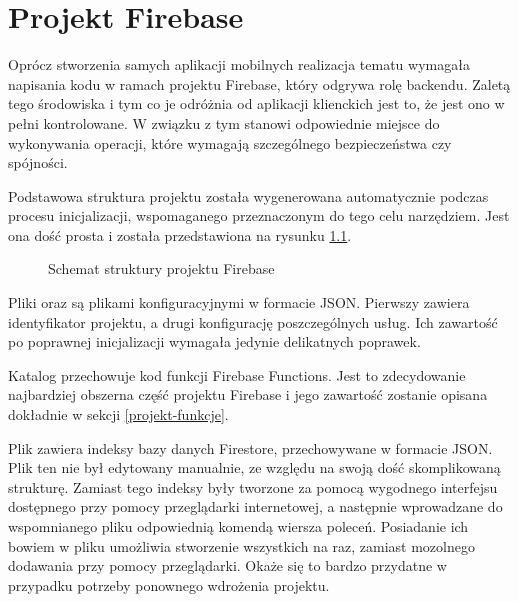 \chapter{Projekt Firebase}
\label{part:firebase}

Oprócz stworzenia samych aplikacji mobilnych realizacja tematu wymagała napisania kodu w ramach projektu Firebase, który odgrywa rolę backendu. Zaletą tego środowiska i tym co je odróżnia od aplikacji klienckich jest to, że jest ono w pełni kontrolowane. W związku z tym stanowi odpowiednie miejsce do wykonywania operacji, które wymagają szczególnego bezpieczeństwa czy spójności.

Podstawowa struktura projektu została wygenerowana automatycznie podczas procesu inicjalizacji, wspomaganego przeznaczonym do tego celu narzędziem. Jest ona dość prosta i została przedstawiona na rysunku \ref{fig:firebase-struktura}.

\begin{figure}[ht!]
  \centering
  \caption{Schemat struktury projektu Firebase}
  \label{fig:firebase-struktura}
\end{figure}

Pliki  oraz  są plikami konfiguracyjnymi w formacie JSON. Pierwszy zawiera identyfikator projektu, a drugi konfigurację poszczególnych usług. Ich zawartość po poprawnej inicjalizacji wymagała jedynie delikatnych poprawek.

Katalog  przechowuje kod funkcji Firebase Functions. Jest to zdecydowanie najbardziej obszerna część projektu Firebase i jego zawartość zostanie opisana dokładnie w sekcji \ref{projekt-funkcje}.

Plik  zawiera indeksy bazy danych Firestore, przechowywane w formacie JSON. Plik ten nie był edytowany manualnie, ze względu na swoją dość skomplikowaną strukturę. Zamiast tego indeksy były tworzone za pomocą wygodnego interfejsu dostępnego przy pomocy przeglądarki internetowej, a następnie wprowadzane do wspomnianego pliku odpowiednią komendą wiersza poleceń. Posiadanie ich bowiem w pliku  umożliwia stworzenie wszystkich na raz, zamiast mozolnego dodawania przy pomocy przeglądarki. Okaże się to bardzo przydatne w przypadku potrzeby ponownego wdrożenia projektu.

